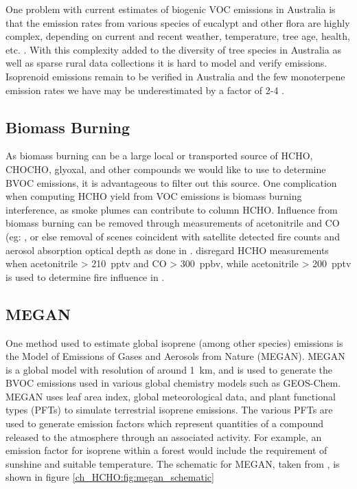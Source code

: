     One problem with current estimates of biogenic VOC emissions in Australia is that the emission rates from various species of eucalypt and other flora are highly complex, depending on current and recent weather, temperature, tree age, health, etc. \citep{Guenther2012}. 
    With this complexity added to the diversity of tree species in Australia as well as sparse rural data collections it is hard to model and verify emissions.
    Isoprenoid emissions remain to be verified in Australia and the few monoterpene emission rates we have may be underestimated by a factor of 2-4 \citep{Winters2009}.
  
  \subsection{Biomass Burning}
    As biomass burning can be a large local or transported source of HCHO, CHOCHO, glyoxal, and other compounds we would like to use to determine BVOC emissions, it is advantageous to filter out this source.
    One complication when computing HCHO yield from VOC emissions is biomass burning interference, as smoke plumes can contribute to column HCHO.
    Influence from biomass burning can be removed through measurements of acetonitrile and CO (eg: \citep{Wolfe2016, Miller2017}, or else removal of scenes coincident with satellite detected fire counts and aerosol absorption optical depth as done in \cite{Marais2014}.
    \citet{Wolfe2016} disregard HCHO measurements when acetonitrile > 210~pptv and CO > 300~ppbv, while acetonitrile > 200~pptv is used to determine fire influence in \cite{Miller2017}.
    
    
  \subsection{MEGAN}
    One method used to estimate global isoprene (among other species) emissions is the Model of Emissions of Gases and Aerosols from Nature (MEGAN). 
    MEGAN is a global model with resolution of around 1~km, and is used to generate the BVOC emissions used in various global chemistry models such as GEOS-Chem.
    MEGAN uses leaf area index, global meteorological data, and plant functional types (PFTs) to simulate terrestrial isoprene emissions.
    The various PFTs are used to generate emission factors which represent quantities of a compound released to the atmosphere through an associated activity.
    For example, an emission factor for isoprene within a forest would include the requirement of sunshine and suitable temperature.
    The schematic for MEGAN, taken from \citet{Megan_Website}, is shown in figure \ref{ch_HCHO:fig:megan_schematic}
    
